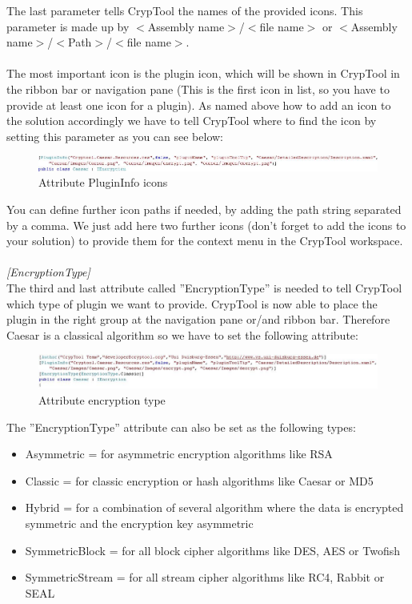 The last parameter tells CrypTool the names of the provided icons. This parameter is made up by $<$Assembly name$>$/$<$file name$>$ or $<$Assembly name$>$/$<$Path$>$/$<$file name$>$.\\\\
The most important icon is the plugin icon, which will be shown in CrypTool in the ribbon bar or navigation pane (This is the first icon in list, so you have to provide at least one icon for a plugin). As named above how to add an icon to the solution accordingly we have to tell CrypTool where to find the icon by setting this parameter as you can see below:
\begin{figure}[h!]
	\centering
		\includegraphics[width=1.00\textwidth]{figures/attribute_plugininfo_icons.jpg}
	\caption{Attribute PluginInfo icons}
	\label{fig:attribute_plugininfo_icons}
\end{figure}

You can define further icon paths if needed, by adding the path string separated by a comma. We just add here two further icons (don't forget to add the icons to your solution) to provide them for the context menu in the CrypTool workspace.\\\\
\textit{[EncryptionType]}\\
The third and last attribute called ''EncryptionType'' is needed to tell CrypTool which type of plugin we want to provide. CrypTool is now able to place the plugin in the right group at the navigation pane or/and ribbon bar. Therefore Caesar is a classical algorithm so we have to set the following attribute:
\begin{figure}[h]
	\centering
		\includegraphics[width=1.00\textwidth]{figures/attribute_encryption_type.JPG}
	\caption{Attribute encryption type}
	\label{fig:attribute_encryption_type}
\end{figure}

The ''EncryptionType'' attribute can also be set as the following types:
\begin{itemize}
	\item Asymmetric = for asymmetric encryption algorithms like RSA
	\item Classic = for classic encryption or hash algorithms like Caesar or MD5
	\item Hybrid = for a combination of several algorithm where the data is encrypted symmetric and the encryption key asymmetric
	\item SymmetricBlock = for all block cipher algorithms like DES, AES or Twofish
	\item SymmetricStream = for all stream cipher algorithms like RC4, Rabbit or SEAL
\end{itemize}


